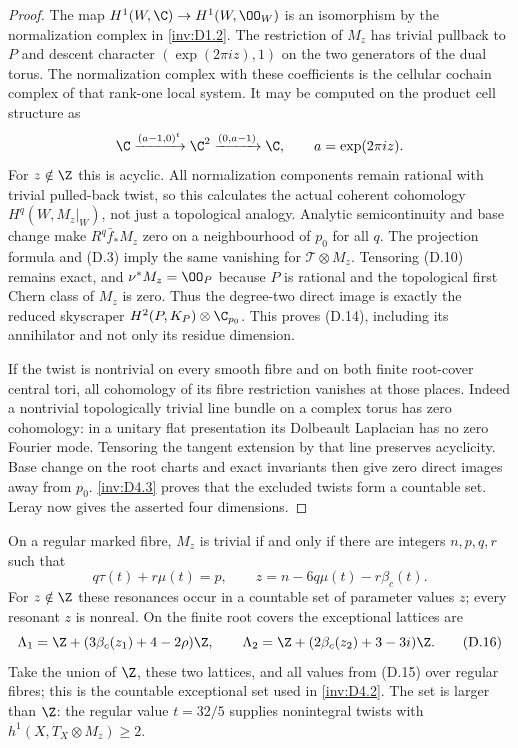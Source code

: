 \begin{proof}
The map $H^1(W,\C)\to H^1(W,\OO_W)$ is an isomorphism by the
normalization complex in \ref{inv:D1.2}. The restriction of $M_z$ has trivial
pullback to $P$ and descent character
$(\exp(2\pi iz),1)$ on the two generators of the dual torus. The
normalization complex with these coefficients is the cellular
cochain complex of that rank-one local system. It may be computed
on the product cell structure as
\[
 \C\xrightarrow{(a-1,0)^t}\C^2
 \xrightarrow{(0,a-1)}\C,
 \qquad a=\exp(2\pi iz).
\]
For $z\notin\Z$ this is acyclic. All normalization components remain
rational with trivial pulled-back twist, so this calculates the
actual coherent cohomology $H^q(W,M_z|_W)$, not just a topological
analogy. Analytic semicontinuity and base change make
$R^q\bar f_*M_z$ zero on a neighbourhood of $p_0$ for all $q$.
The projection formula and (D.3) imply the same vanishing for
$\mathcal T\otimes M_z$. Tensoring (D.10) remains exact, and
$\nu^*M_z=\OO_P$ because $P$ is rational and the topological first
Chern class of $M_z$ is zero. Thus the degree-two direct image is
exactly the reduced skyscraper $H^2(P,K_P)\otimes\C_{p_0}$.
This proves (D.14), including its annihilator and not only its residue
dimension.

If the twist is nontrivial on every smooth fibre and on both finite
root-cover central tori, all cohomology of its fibre restriction
vanishes at those places. Indeed a nontrivial topologically trivial
line bundle on a complex torus has zero cohomology: in a unitary flat
presentation its Dolbeault Laplacian has no zero Fourier mode.
Tensoring the tangent extension by that line preserves acyclicity.
Base change on the root charts and exact invariants then give zero
direct images away from $p_0$. \ref{inv:D4.3} proves that the excluded twists
form a countable set. Leray now gives the asserted four dimensions.
\end{proof}

\begin{proposition}\label{inv:D4.3}
On a regular marked fibre, $M_z$ is trivial if and only if there are
integers $n,p,q,r$ such that
\[
 q\tau(t)+r\mu(t)=p,\qquad
 z=n-6q\mu(t)-r\beta_c(t).                             \tag{D.15}
\]
For $z\notin\Z$ these resonances occur in a countable set of parameter
values $z$; every resonant $z$ is nonreal. On the finite root covers
the exceptional lattices are
\[
 \Lambda_1=\Z+(3\beta_c(z_1)+4-2\rho)\Z,\qquad
 \Lambda_2=\Z+(2\beta_c(z_2)+3-3i)\Z.                  \tag{D.16}
\]
Take the union of $\Z$, these two lattices, and all values from (D.15)
over regular fibres; this is the countable exceptional set used in
\ref{inv:D4.2}. The set is larger than $\Z$: the regular value $t=32/5$
supplies nonintegral twists with $h^1(X,T_X\otimes M_z)\ge2$.
\end{proposition}


